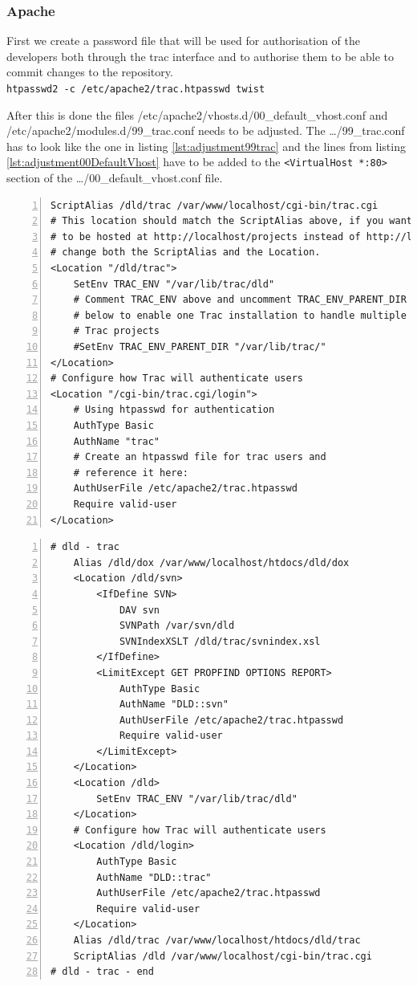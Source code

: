    \subsubsection{Apache}
   First we create a password file that will be used for authorisation of the developers both through the trac interface and to authorise them to be able to commit changes to the repository.\\
   \verb=htpasswd2 -c /etc/apache2/trac.htpasswd twist=

   After this is done the files /etc/apache2/vhosts.d/00\_default\_vhost.conf and /etc/apache2/modules.d/99\_trac.conf needs to be adjusted. The \dots/99\_trac.conf has to look like the one in listing \ref{lst:adjustment99trac} and the lines from listing \ref{lst:adjustment00DefaultVhost} have to be added to the \verb=<VirtualHost *:80>= section of the \dots/00\_default\_vhost.conf file.

   \begin{lstlisting}[frame=single,breaklines,basicstyle=\footnotesize,numbers=left,label=lst:adjustment99trac,captionpos=b,caption={Adjustment of the file /etc/apache2/modules.d/99\_trac.conf}]
ScriptAlias /dld/trac /var/www/localhost/cgi-bin/trac.cgi
# This location should match the ScriptAlias above, if you want trac
# to be hosted at http://localhost/projects instead of http://localhost/trac
# change both the ScriptAlias and the Location.
<Location "/dld/trac">
	SetEnv TRAC_ENV "/var/lib/trac/dld"
	# Comment TRAC_ENV above and uncomment TRAC_ENV_PARENT_DIR
	# below to enable one Trac installation to handle multiple
	# Trac projects
	#SetEnv TRAC_ENV_PARENT_DIR "/var/lib/trac/"
</Location>
# Configure how Trac will authenticate users
<Location "/cgi-bin/trac.cgi/login">
	# Using htpasswd for authentication
	AuthType Basic
	AuthName "trac"
	# Create an htpasswd file for trac users and
	# reference it here:
	AuthUserFile /etc/apache2/trac.htpasswd
	Require valid-user
</Location>
   \end{lstlisting}

   \begin{lstlisting}[frame=single,breaklines,basicstyle=\footnotesize,numbers=left,label=lst:adjustment00DefaultVhost,captionpos=b,caption={Adjustment of the file /etc/apache2/vhosts.d/00\_default\_vhost.conf}]
# dld - trac
	Alias /dld/dox /var/www/localhost/htdocs/dld/dox
	<Location /dld/svn>
		<IfDefine SVN>
			DAV svn
			SVNPath /var/svn/dld
			SVNIndexXSLT /dld/trac/svnindex.xsl
		</IfDefine>
		<LimitExcept GET PROPFIND OPTIONS REPORT>
			AuthType Basic
			AuthName "DLD::svn"
			AuthUserFile /etc/apache2/trac.htpasswd
			Require valid-user
		</LimitExcept>
	</Location>
	<Location /dld>
		SetEnv TRAC_ENV "/var/lib/trac/dld"
	</Location>
	# Configure how Trac will authenticate users
	<Location /dld/login>
		AuthType Basic
		AuthName "DLD::trac"
		AuthUserFile /etc/apache2/trac.htpasswd
		Require valid-user
	</Location>
	Alias /dld/trac /var/www/localhost/htdocs/dld/trac
	ScriptAlias /dld /var/www/localhost/cgi-bin/trac.cgi
# dld - trac - end
   \end{lstlisting}

